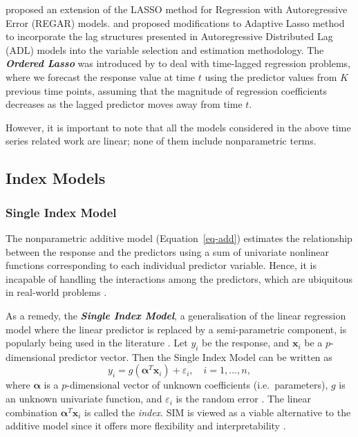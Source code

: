 \documentclass[11pt,a4paper,]{article}
\begin{document}
\textcite{Wang2007} proposed an extension of the LASSO method for
Regression with Autoregressive Error (REGAR) models. \textcite{Park2013}
and \textcite{Konzen2016} proposed modifications to Adaptive Lasso
method to incorporate the lag structures presented in Autoregressive
Distributed Lag (ADL) models into the variable selection and estimation
methodology. The \textbf{\emph{Ordered Lasso}} was introduced by
\textcite{Tibshirani2016} to deal with time-lagged regression problems,
where we forecast the response value at time \(t\) using the predictor
values from \(K\) previous time points, assuming that the magnitude of
regression coefficients decreases as the lagged predictor moves away
from time \(t\).

However, it is important to note that all the models considered in the
above time series related work are linear; none of them include
nonparametric terms.

\hypertarget{index-models}{%
\subsection{Index Models}\label{index-models}}

\hypertarget{single-index-model}{%
\subsubsection{Single Index Model}\label{single-index-model}}

The nonparametric additive model (Equation~\ref{eq-add}) estimates the
relationship between the response and the predictors using a sum of
univariate nonlinear functions corresponding to each individual
predictor variable. Hence, it is incapable of handling the interactions
among the predictors, which are ubiquitous in real-world problems
\autocite{Zhang2008}.

As a remedy, the \textbf{\emph{Single Index Model}}, a generalisation of
the linear regression model where the linear predictor is replaced by a
semi-parametric component, is popularly being used in the literature
\autocite{Radchenko2015}. Let \(y_{i}\) be the response, and
\(\bm{x}_{i}\) be a \(p\)-dimensional predictor vector. Then the Single
Index Model can be written as \[
  y_{i} = g \left ( \bm{\alpha}^{T} \bm{x}_{i} \right ) + \varepsilon_{i}, \quad i = 1, \dots, n,
\] where \(\bm{\alpha}\) is a \(p\)-dimensional vector of unknown
coefficients (i.e.~parameters), \(g\) is an unknown univariate function,
and \(\varepsilon_{i}\) is the random error
\autocite{Stoker1986,Hardle1993}. The linear combination
\(\bm{\alpha}^{T} \bm{x}_{i}\) is called the \emph{index}. SIM is viewed
as a viable alternative to the additive model since it offers more
flexibility and interpretability \autocite{Radchenko2015}.
\end{document}

